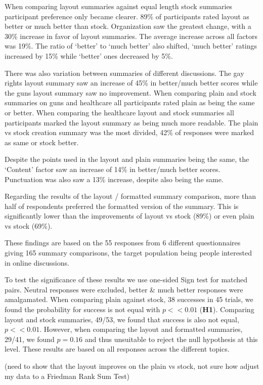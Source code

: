       When comparing layout summaries against equal length stock summaries participant preference only became clearer. 89\% of participants rated layout as better or much better than stock. Organization saw the greatest change, with a 30\% increase in favor of layout summaries. The average increase across all factors was 19\%. The ratio of `better' to `much better' also shifted, `much better' ratings increased by 15\% while `better' ones decreased by 5\%.

      There was also variation between summaries of different discussions. The gay rights layout summary saw an increase of 45\% in better/much better scores while the guns layout summary saw no improvement. When comparing plain and stock summaries on guns and healthcare all participants rated plain as being the same or better. When comparing the healthcare layout and stock summaries all participants marked the layout summary as being much more readable. The plain vs stock creation summary was the most divided, 42\% of responses were marked as same or stock better.

      Despite the points used in the layout and plain summaries being the same, the `Content' factor saw an increase of 14\% in better/much better scores. Punctuation was also saw a 13\% increase, despite also being the same.

      Regarding the results of the layout / formatted summary comparison, more than half of respondents preferred the formatted version of the summary. This is significantly lower than the improvements of layout vs stock (89\%) or even plain vs stock (69\%).

      These findings are based on the 55 responses from 6 different questionnaires giving 165 summary comparisons, the target population being people interested in online discussions.

      To test the significance of these results we use one-sided Sign test for matched pairs. Neutral responses were excluded, better \& much better responses were amalgamated. When comparing plain against stock, 38 successes in 45 trials, we found the probability for success is not equal with $p << 0.01$ (\textbf{H1}). Comparing layout and stock summaries, 49/53, we found that success is also not equal, $p << 0.01$. However, when comparing the layout and formatted summaries, 29/41, we found $p = 0.16$ and thus unsuitable to reject the null hypothesis at this level. These results are based on all responses across the different topics.

      (need to show that the layout improves on the plain vs stock, not sure how adjust my data to a Friedman Rank Sum Test)

